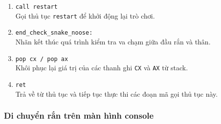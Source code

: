 \documentclass[12pt]{article}
\begin{document}
\begin{enumerate}[label=\textbf{\arabic*.}]
    \item \texttt{call restart} \\
    Gọi thủ tục \texttt{restart} để khởi động lại trò chơi.

    \item \texttt{end\_check\_snake\_noose:} \\
    Nhãn kết thúc quá trình kiểm tra va chạm giữa đầu rắn và thân.

    \item \texttt{pop cx / pop ax} \\
    Khôi phục lại giá trị của các thanh ghi \texttt{CX} và \texttt{AX} từ stack.

    \item \texttt{ret} \\
    Trả về từ thủ tục và tiếp tục thực thi các đoạn mã gọi thủ tục này.
\end{enumerate}
\subsubsection*{Di chuyển rắn trên màn hình console}
\end{document}
